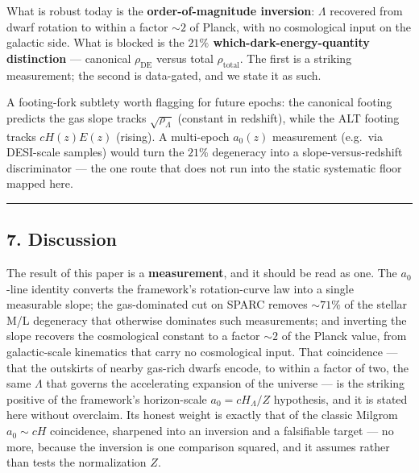 \documentclass[
]{article}
\begin{document}
What is robust today is the \textbf{order-of-magnitude inversion}:
\(\Lambda\) recovered from dwarf rotation to within a factor \(\sim2\)
of Planck, with no cosmological input on the galactic side. What is
blocked is the \textbf{\(21\%\) which-dark-energy-quantity distinction}
--- canonical \(\rho_\mathrm{DE}\) versus total \(\rho_\mathrm{total}\). The
first is a striking measurement; the second is data-gated, and we state
it as such.

A footing-fork subtlety worth flagging for future epochs: the canonical
footing predicts the gas slope tracks \(\sqrt{\rho_\Lambda}\) (constant
in redshift), while the ALT footing tracks \(cH(z)E(z)\) (rising). A
multi-epoch \(a_0(z)\) measurement (e.g.~via DESI-scale samples) would
turn the \(21\%\) degeneracy into a slope-versus-redshift discriminator
--- the one route that does not run into the static systematic floor
mapped here.

\begin{center}\rule{0.5\linewidth}{0.5pt}\end{center}

\subsection{7. Discussion}\label{discussion}

The result of this paper is a \textbf{measurement}, and it should be
read as one. The \(a_0\)-line identity converts the framework's
rotation-curve law into a single measurable slope; the gas-dominated cut
on SPARC removes \(\sim71\%\) of the stellar M/L degeneracy that
otherwise dominates such measurements; and inverting the slope recovers
the cosmological constant to a factor \(\sim2\) of the Planck value,
from galactic-scale kinematics that carry no cosmological input. That
coincidence --- that the outskirts of nearby gas-rich dwarfs encode, to
within a factor of two, the same \(\Lambda\) that governs the
accelerating expansion of the universe --- is the striking positive of
the framework's horizon-scale \(a_0=cH_\Lambda/Z\) hypothesis, and it is
stated here without overclaim. Its honest weight is exactly that of the
classic Milgrom \(a_0\sim cH\) coincidence, sharpened into an inversion
and a falsifiable target --- no more, because the inversion is one
comparison squared, and it assumes rather than tests the normalization
\(Z\).
\end{document}
